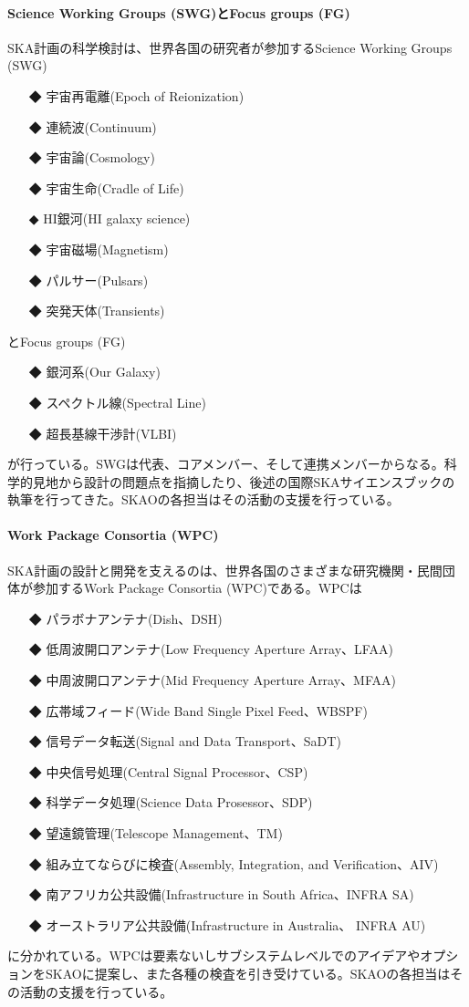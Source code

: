 \paragraph{Science Working Groups (SWG)とFocus groups (FG)}

SKA計画の科学検討は、世界各国の研究者が参加するScience Working Groups (SWG)
\begin{itemize}
\item[◆] 宇宙再電離(Epoch of Reionization)
\item[◆] 連続波(Continuum)
\item[◆] 宇宙論(Cosmology)
\item[◆] 宇宙生命(Cradle of Life)
\item[◆] HI銀河(HI galaxy science)
\item[◆] 宇宙磁場(Magnetism)
\item[◆] パルサー(Pulsars)
\item[◆] 突発天体(Transients)
\end{itemize}
とFocus groups (FG)
\begin{itemize}
\item[◆] 銀河系(Our Galaxy)
\item[◆] スペクトル線(Spectral Line)
\item[◆] 超長基線干渉計(VLBI)
\end{itemize}
が行っている。SWGは代表、コアメンバー、そして連携メンバーからなる。科学的見地から設計の問題点を指摘したり、後述の国際SKAサイエンスブックの執筆を行ってきた。SKAOの各担当はその活動の支援を行っている。

\paragraph{Work Package Consortia (WPC)}

SKA計画の設計と開発を支えるのは、世界各国のさまざまな研究機関・民間団体が参加するWork Package Consortia (WPC)である。WPCは
\begin{itemize}
\item[◆] パラボナアンテナ(Dish、DSH)
\item[◆] 低周波開口アンテナ(Low Frequency Aperture Array、LFAA)
\item[◆] 中周波開口アンテナ(Mid Frequency Aperture Array、MFAA)
\item[◆] 広帯域フィード(Wide Band Single Pixel Feed、WBSPF)
\item[◆] 信号データ転送(Signal and Data Transport、SaDT)
\item[◆] 中央信号処理(Central Signal Processor、CSP)
\item[◆] 科学データ処理(Science Data Prosessor、SDP)
\item[◆] 望遠鏡管理(Telescope Management、TM)
\item[◆] 組み立てならびに検査(Assembly, Integration, and Verification、AIV)
\item[◆] 南アフリカ公共設備(Infrastructure in South Africa、INFRA SA)
\item[◆] オーストラリア公共設備(Infrastructure in Australia、 INFRA AU)
\end{itemize}
に分かれている。WPCは要素ないしサブシステムレベルでのアイデアやオプションをSKAOに提案し、また各種の検査を引き受けている。SKAOの各担当はその活動の支援を行っている。


